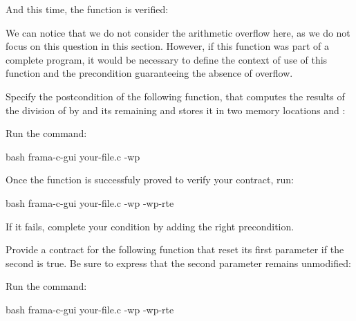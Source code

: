 


And this time, the function is verified:





We can notice that we do not consider the arithmetic overflow here, as
we do not focus on this question in this section. However, if this
function was part of a complete program, it would be necessary to define
the context of use of this function and the precondition guaranteeing
the absence of overflow.








Specify the postcondition of the following function, that computes the
results of the division of  by  and its
remaining and stores it in two memory locations  and
:



Run the command:

\begin{CodeBlock}{bash}
frama-c-gui your-file.c -wp 
\end{CodeBlock}


Once the function is successfuly proved to verify your contract, run:


\begin{CodeBlock}{bash}
frama-c-gui your-file.c -wp -wp-rte
\end{CodeBlock}


If it fails, complete your condition by adding the right precondition.






Provide a contract for the following function that reset its first parameter
if the second is true. Be sure to express that the second parameter remains
unmodified:




Run the command:


\begin{CodeBlock}{bash}
frama-c-gui your-file.c -wp -wp-rte
\end{CodeBlock}




